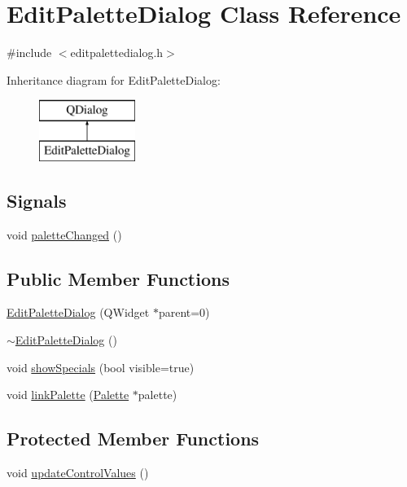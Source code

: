 \hypertarget{class_edit_palette_dialog}{}\section{Edit\+Palette\+Dialog Class Reference}
\label{class_edit_palette_dialog}


{\ttfamily \#include $<$editpalettedialog.\+h$>$}

Inheritance diagram for Edit\+Palette\+Dialog\+:\begin{figure}[H]
\begin{center}
\leavevmode
\includegraphics[height=2.000000cm]{d0/d07/class_edit_palette_dialog}
\end{center}
\end{figure}
\subsection*{Signals}
\begin{DoxyCompactItemize}
\item 
void \mbox{\hyperlink{class_edit_palette_dialog_abbbe561bee6cdc5466a18feee86b3400}{palette\+Changed}} ()
\end{DoxyCompactItemize}
\subsection*{Public Member Functions}
\begin{DoxyCompactItemize}
\item 
\mbox{\hyperlink{class_edit_palette_dialog_a8954169846ffb0629c7e7660a1c6e2b3}{Edit\+Palette\+Dialog}} (Q\+Widget $\ast$parent=0)
\item 
\mbox{\hyperlink{class_edit_palette_dialog_a00f4efe132d80838589a9e8105bc918f}{$\sim$\+Edit\+Palette\+Dialog}} ()
\item 
void \mbox{\hyperlink{class_edit_palette_dialog_a4796d65ae16b08590f2503f3616aa97a}{show\+Specials}} (bool visible=true)
\item 
void \mbox{\hyperlink{class_edit_palette_dialog_ae745b99777f862e73394d4ae49e9b5f4}{link\+Palette}} (\mbox{\hyperlink{class_palette}{Palette}} $\ast$palette)
\end{DoxyCompactItemize}
\subsection*{Protected Member Functions}
\begin{DoxyCompactItemize}
\item 
void \mbox{\hyperlink{class_edit_palette_dialog_adac29663b7210f76ab09ed48c2943a2b}{update\+Control\+Values}} ()
\end{DoxyCompactItemize}


